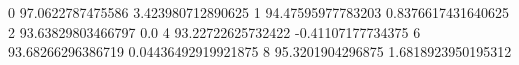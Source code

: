 0 97.0622787475586 3.423980712890625
1 94.47595977783203 0.8376617431640625
2 93.63829803466797 0.0
4 93.22722625732422 -0.41107177734375
6 93.68266296386719 0.04436492919921875
8 95.3201904296875 1.6818923950195312
